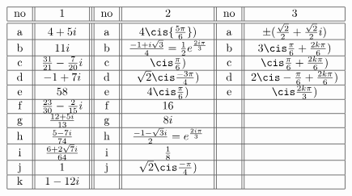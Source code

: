 \[ \begin{tabular}{| c || c || | c | | c | | c | | c | c | }
\hline  no &         ${ 1}                                                         $    & no     &        ${ 2}  $                           	         & no         &      ${ 3}  $            \\    \hline \hline
           a   &      $4+5i                      $  				            & a  &   $4\cis{\frac{5\pi}{6}})$     		                  &a&  $\pm(\frac{\sqrt 2}{2}+ \frac{\sqrt 2}{2}i)$  \\ \hline 
           b  &      $11i                                        $   			   & b  &  $\frac{-1+i\sqrt 3}{4}=\frac{ 1 }{2} e^{\frac{ 2i\pi }{ 3 }}      $          		          &b & $3\cis \frac{\pi}{6}+\frac{2k\pi}{6})$ \\ \hline
           c   &      $\frac{31}{21}-\frac{7}{20}i                      $   		   & c  & $\cis\frac{\pi}{6})	 $   				   &c&  $\cis \frac{\pi}{6}+\frac{2k\pi}{6})$  \\ \hline 
           d   &      $-1+7i                                  $   			   & d &   $\sqrt 2\cis\frac{-3\pi}{4})$ 			        &d&  $ 2\cis -\frac{\pi}{6}+\frac{2k\pi}{6}) $\\ \hline 
           e   &      $58          $   						   & e &  $4   	\cis\frac{\pi}{6})	 $			&e& $\cis \frac{2k\pi}{3})$ \\ \hline
           f   &      $\frac{23}{30}-\frac{2}{15}i   $    			            & f  & $16      $       		 
& &  \\ \hline
           g   &      $\frac{12+5i}{13}   			 $   			   & g  & $8i$                  					 & &  \\ \hline
           h   &    $\frac{5-7i}{74}  			 $ 			    	   & h  & $\frac{-1-\sqrt3 i}{2}= e^{\frac{ 2i\pi }{ 3 }}$                                         & & \\ \hline
           i    &      $      	\frac{6+2\sqrt 7 i}{64}         $  			   & i  & $ \frac{1}{8}$                &          &                           \\  \hline
           j    &      $      	1				         $    		  & j  & $ \sqrt 2 \cis \frac{-\pi}{4} )$                &          &                           \\  \hline
          k   &      $      	1-12i				         $    		  &  &                 &          &                           \\  \hline           
\end{tabular} \]


